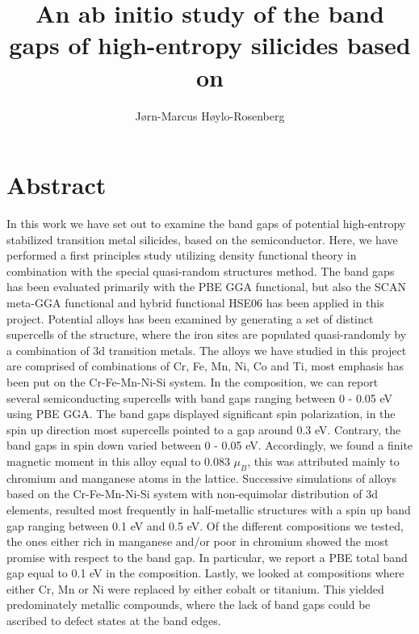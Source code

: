\documentclass[UKenglish]{ifimaster}  %
\title{An ab initio study of the band gaps of high-entropy silicides based on \ch{FeSi2}}        %
\author{Jørn-Marcus Høylo-Rosenberg}                      %
\begin{document}
\duoforside[dept={Department of Chemistry},   %
  program={Materials Science for Energy and Nanotechnology},  %
  long]                                        %

\frontmatter{}  

\chapter*{Abstract}                   %

In this work we have set out to examine the band gaps of potential high-entropy stabilized transition metal silicides, based on the  semiconductor. Here, we have performed a first principles study utilizing density functional theory in combination with the special quasi-random structures method. The band gaps has been evaluated primarily with the PBE GGA functional, but also the SCAN meta-GGA functional and hybrid functional HSE06 has been applied in this project. Potential alloys has been examined by generating a set of distinct supercells of the  structure, where the iron sites are populated quasi-randomly by a combination of 3d transition metals. The alloys we have studied in this project are comprised of combinations of Cr, Fe, Mn, Ni, Co and Ti, most emphasis has been put on the Cr-Fe-Mn-Ni-Si system. In the  composition, we can report several semiconducting supercells with band gaps ranging between 0 - 0.05 eV using PBE GGA. The band gaps displayed significant spin polarization, in the spin up direction most supercells pointed to a gap around 0.3 eV. Contrary, the band gaps in spin down varied between 0 - 0.05 eV. Accordingly, we found a finite magnetic moment in this alloy equal to 0.083 $\mu_B$, this was attributed mainly to chromium and manganese atoms in the lattice. Successive simulations of alloys based on the Cr-Fe-Mn-Ni-Si system with non-equimolar distribution of 3d elements, resulted most frequently in half-metallic structures with a spin up band gap ranging between 0.1 eV and 0.5 eV. Of the different compositions we tested, the ones either rich in manganese and/or poor in chromium showed the most promise with respect to the band gap. In particular, we report a PBE total band gap equal to 0.1 eV in the  composition. Lastly, we looked at compositions where either Cr, Mn or Ni were replaced by either cobalt or titanium. This yielded predominately metallic compounds, where the lack of band gaps could be ascribed to defect states at the band edges. 
\end{document}
